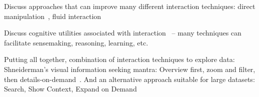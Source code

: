 %
%

Discuss approaches that can improve many different interaction techniques: direct manipulation~\cite{Shneiderman1982, Kwon2011}, fluid interaction~\cite{Elmqvist2011}

Discuss cognitive utilities associated with interaction~\cite{Sedig2013} -- many techniques can facilitate sensemaking, reasoning, learning, etc.

Putting all together, combination of interaction techniques to explore data: Shneiderman's visual information seeking mantra: Overview first, zoom and filter, then details-on-demand~\cite{Shneiderman1996}. And an alternative approach suitable for large datasets: Search, Show Context, Expand on Demand ~\cite{VanHam2009}

